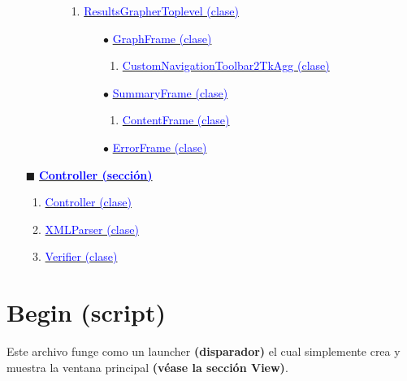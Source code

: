 \documentclass[12pt,twoside]{article}
\begin{document}
\begin{itemize}
\begin{enumerate}[$\square$]
\begin{itemize}
                  \begin{enumerate}[$\triangleright$]
                  \item \hyperref[sec:a_3_3_3_1]{\textcolor{blue}{ResultsGrapherToplevel (clase)}}
                        \begin{itemize}
                        \item[$\bullet$] \hyperref[sec:a_3_3_3_1_1]{\textcolor{blue}{GraphFrame (clase)}}
                              \begin{enumerate}[$\circ$]
                              \item \hyperref[sec:a_3_3_3_1_1_1]{\textcolor{blue}{CustomNavigationToolbar2TkAgg (clase)}}
                              \end{enumerate}
                        \item[$\bullet$] \hyperref[sec:a_3_3_3_1_2]{\textcolor{blue}{SummaryFrame (clase)}}
                              \begin{enumerate}[$\circ$]
                              \item \hyperref[sec:a_3_3_3_1_2_1]{\textcolor{blue}{ContentFrame (clase)}}
                              \end{enumerate}
                        \item[$\bullet$] \hyperref[sec:a_3_3_3_1_3]{\textcolor{blue}{ErrorFrame (clase)}}
                        \end{itemize}
                  \end{enumerate}
            \end{itemize}
      \end{enumerate} 
\item[$\blacksquare$] \hyperref[sec:a_4]{\textbf{\textcolor{blue}{\large Controller (sección)}}}     
      \begin{enumerate}[$\square$] 
      \item \hyperref[sec:a_4_1]{\textcolor{blue}{Controller (clase)}}
      \item \hyperref[sec:a_4_2]{\textcolor{blue}{XMLParser (clase)}}
      \item \hyperref[sec:a_4_3]{\textcolor{blue}{Verifier (clase)}}
      \end{enumerate}
\end{itemize}

\section{Begin (script)}
\label{sec:a_1}
Este archivo funge como un launcher \textbf{(disparador)} el cual simplemente 
crea y muestra la ventana principal \textbf{(véase la sección View)}.





\end{document}
